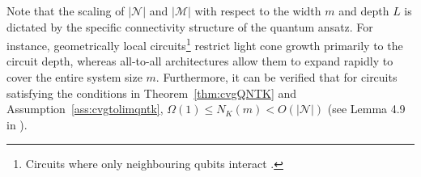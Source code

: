 \documentclass[pdflatex,sn-mathphys-num]{sn-jnl}%
\theoremstyle{thmstyleone}%
\theoremstyle{thmstyletwo}%
\theoremstyle{thmstylethree}%
\newcommand{\xbf}{\mathbf{x}}
\newcommand{\Kbf}{\mathbf{K}}
\newcommand{\thetabf}{\bm{\theta}}
\begin{document}
Note that the scaling of $|\mathcal N|$ and $|\mathcal M|$ with respect to the width $m$ and depth $L$ is dictated by the specific connectivity structure of the quantum ansatz. For instance, geometrically local circuits\footnote{Circuits where only neighbouring qubits interact \cite{abedi2023quantum}.} restrict light cone growth primarily to the circuit depth, whereas all-to-all architectures allow them to expand rapidly to cover the entire system size $m$.
Furthermore, it can be verified  that for circuits satisfying the conditions in Theorem~\ref{thm:cvgQNTK} and Assumption~\ref{ass:cvgtolimqntk}, $\Omega(1) \leq N_K(m) < O(|\mathcal N|)$ (see Lemma 4.9 in \cite{Girardi2025}).
\end{document}
